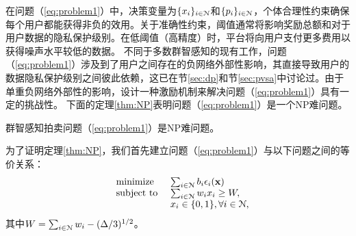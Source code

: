 	在问题（\ref{eq:problem1}）中，决策变量为$\{x_i\}_{i\in\mathcal{N}}$和$\{p_i\}_{i\in\mathcal{N}}$，个体合理性约束确保每个用户都能获得非负的效用。关于准确性约束，阈值通常将影响奖励总额和对于用户数据的隐私保护级别。在低阈值（高精度）时，平台将向用户支付更多费用以获得噪声水平较低的数据。
	不同于多数群智感知的现有工作，问题（\ref{eq:problem1}）涉及到了用户之间存在的负网络外部性影响，其直接导致用户的数据隐私保护级别之间彼此依赖，这已在节\ref{sec:dp}和节\ref{sec:pvsa}中讨论过。由于单重负网络外部性的影响，设计一种激励机制来解决问题（\ref{eq:problem1}）具有一定的挑战性。
	下面的定理\ref{thm:NP}表明问题（\ref{eq:problem1}）是一个NP难问题。
	
	\begin{thm}\label{thm:NP}
		群智感知拍卖问题（\ref{eq:problem1}）是NP难问题。
	\end{thm}
	
	为了证明定理\ref{thm:NP}，我们首先建立问题（\ref{eq:problem1}）与以下问题之间的等价关系：
	\begin{equation}%
	\hspace{-0.0cm}
	\begin{array}
	[c]{lll}%
	&{\text{minimize}}&~\sum_{i\in\N}b_i\e_i(\mathbf{x})
	\\
	&\text{subject to}&~ \sum_{i\in\N}w_ix_i\ge W,\\
	&&~ x_i\in\{0,1\}, \forall i\in\N,
	\end{array}
	\label{eq:problem2}
	\end{equation}
	其中$W=\sum_{i\in\mathcal{N}}w_i-(\Delta/3)^{1/2}$。
	
